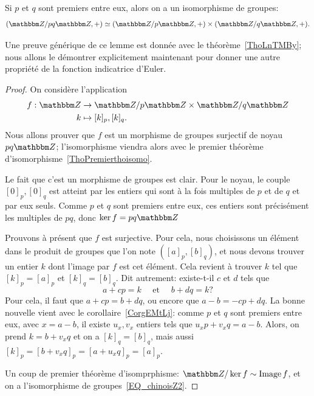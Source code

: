 \begin{lemma}  \label{LEM_chinoisZ2}
  Si \( p \) et \( q \) sont premiers entre eux, alors on a un isomorphisme de groupes:
   \begin{equation}\label{EQ_chinoisZ2}
        (\eZ/pq\eZ,+)\simeq(\eZ/p\eZ,+)\times(\eZ/q\eZ,+).
   \end{equation}
\end{lemma}
Une preuve générique de ce lemme est donnée avec le théorème~\ref{ThoLnTMBy}; nous allons le démontrer explicitement maintenant pour donner une autre propriété de la fonction indicatrice d'Euler.

\begin{proof}
  On considère l'application
  \begin{align*}
  f: \eZ &\to \eZ/p\eZ \times \eZ/q\eZ\\
  k &\mapsto [k]_p, [k]_q.
  \end{align*}
  Nous allons prouver que \( f \) est un morphisme de groupes surjectif de noyau \( pq\eZ \); l'isomorphisme viendra alors avec le premier théorème d'isomorphisme~\ref{ThoPremierthoisomo}.
  
  Le fait que c'est un morphisme de groupes est clair. Pour le noyau, le couple \([0]_p, [0]_q\) est atteint par les entiers qui sont à la fois multiples de \( p \) et de \( q \) et par eux seuls. Comme \( p \) et \( q \) sont premiers entre eux, ces entiers sont précisément les multiples de \( pq \), donc \( \ker f = pq\eZ \)
  
  Prouvons à présent que \(f\) est surjective. Pour cela, nous choisissons un élément dans le produit de groupes que l'on note \( ([a]_p, [b]_q) \), et nous devons trouver un entier \( k \) dont l'image par  \( f \) est cet élément. Cela revient à trouver \( k \) tel que  \( [k]_p =  [a]_p \) et \([k]_q = [b]_q\). Dit autrement: existe-t-il \(c \) et \( d \) tels que
  \begin{equation}
  a + cp = k \quad\text{ et }\quad b + dq = k ?
  \end{equation}
  Pour cela, il faut que \(a + cp = b + dq \), ou encore que \( a - b = - cp + dq \). La bonne nouvelle vient avec le corollaire~\ref{CorgEMtLj}: comme \( p\) et \( q\) sont premiers entre eux, avec \( x = a-b \), il existe \( u_x, v_x \) entiers tels que \(u_x p + v_x q = a - b \). Alors, on prend \( k = b + v_x q \) et on a \([k]_q = [b]_q\), mais aussi \( [k]_p =  [b + v_x q]_p = [a + u_x q]_p = [a]_p \).
  
  Un coup de premier théorème d'isomprphisme: \( \eZ / \ker f \sim \Image f \), et on a l'isomorphisme de groupes~\eqref{EQ_chinoisZ2}.
\end{proof}


